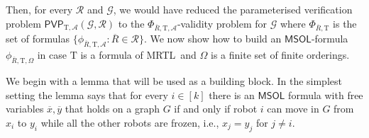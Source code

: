 \documentclass{llncs}
\newtheorem{lemma}{Lemma}
\def\MRTL{\textsf{MRTL}}
\def\gclass{\mathcal{G}}
\def\rclass{\mathcal{R}}
\def\T{\mathrm{T}}
\def\nat{\mathbb{N}}
\def\PVP{\mathsf{PVP}}
\newcommand{\tup}[1]{\overline{#1}}
\newcommand{\tpl}[1]{\left<{#1}\right>}
\def\ins{\textsc{ins}}
\def\msol{\mathsf{MSOL}}
\begin{document}
Then, for every $\rclass$ and $\gclass$, we would have reduced the parameterised verification problem $\PVP_{\T,\mathcal{A}}(\gclass,\rclass)$ to the $\Phi_{\tup{R},\T,\mathcal{A}}$-validity problem for $\gclass$ where $\Phi_{\tup{R},\T}$ is the set of formulas $\{\phi_{\tup{R},\T,\mathcal{A}} : \tup{R} \in \rclass\}$. We now show how to build an $\msol$-formula
$\phi_{\tup{R},\T,\Omega}$ in case $\T$ is a formula of \MRTL\ and $\Omega$ is a finite set of finite orderings.

We begin with a lemma that will be used as a building block. In the simplest setting the lemma says that for every $i \in [k]$ there is an $\msol$ formula with free variables $\tup{x},\tup{y}$ that holds on a graph $G$ if and only if robot $i$ can move in $G$ from $x_i$ to $y_i$ while all the other robots are frozen, i.e.,  $x_j = y_j$ for $j \neq i$.

%
\end{document}
